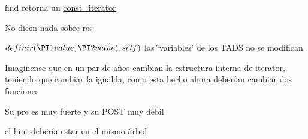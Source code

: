
\begin{DoxyRefList}
\item[\label{deprecated__deprecated000006}%
\hypertarget{deprecated__deprecated000006}{}%
Miembro \hyperlink{classaed2_1_1map_a0b0a11f906da2926f9eb342fcee79fd7_a0b0a11f906da2926f9eb342fcee79fd7}{aed2\+:\+:map$<$ Key, Meaning, Compare $>$\+:\+:at} (const Key \&key) const ]find retorna un \hyperlink{classaed2_1_1map_1_1const__iterator}{const\+\_\+iterator}  
\item[\label{deprecated__deprecated000008}%
\hypertarget{deprecated__deprecated000008}{}%
Miembro \hyperlink{classaed2_1_1map_ad8e796bf9c9c558e5ce6b61e116253fe_ad8e796bf9c9c558e5ce6b61e116253fe}{aed2\+:\+:map$<$ Key, Meaning, Compare $>$\+:\+:erase} (\hyperlink{classaed2_1_1map_1_1const__iterator}{const\+\_\+iterator} pos)]No dicen nada sobre res 
\item[\label{deprecated__deprecated000007}%
\hypertarget{deprecated__deprecated000007}{}%
Miembro \hyperlink{classaed2_1_1map_a2ef6723c183916276b0afc4a4c721475_a2ef6723c183916276b0afc4a4c721475}{aed2\+:\+:map$<$ Key, Meaning, Compare $>$\+:\+:insert\+\_\+or\+\_\+assign} (\hyperlink{classaed2_1_1map_1_1const__iterator}{const\+\_\+iterator} hint, const value\+\_\+type \&value)]$ definir(\PI1 value, \PI2 value), self) $ las \char`\"{}variables\char`\"{} de los T\+A\+DS no se modifican 
\item[\label{deprecated__deprecated000010}%
\hypertarget{deprecated__deprecated000010}{}%
Miembro \hyperlink{classaed2_1_1map_1_1iterator_a836c7a166d63f507c4f79085ae953c51_a836c7a166d63f507c4f79085ae953c51}{aed2\+:\+:map$<$ Key, Meaning, Compare $>$\+:\+:iterator\+:\+:operator!=} (iterator other) const ]Imaginense que en un par de años cambian la estructura interna de iterator, teniendo que cambiar la igualda, como esta hecho ahora deberían cambiar dos funciones 
\item[\label{deprecated__deprecated000009}%
\hypertarget{deprecated__deprecated000009}{}%
Miembro \hyperlink{classaed2_1_1map_1_1iterator_ad052c1ef8477a1613c292202226053a5_ad052c1ef8477a1613c292202226053a5}{aed2\+:\+:map$<$ Key, Meaning, Compare $>$\+:\+:iterator\+:\+:operator==} (iterator other) const ]Su pre es muy fuerte y su P\+O\+ST muy débil 
\item[\label{deprecated__deprecated000003}%
\hypertarget{deprecated__deprecated000003}{}%
Miembro \hyperlink{classaed2_1_1map_a7a77950a3d8e637bfa7cf5dcd904f257_a7a77950a3d8e637bfa7cf5dcd904f257}{aed2\+:\+:map$<$ Key, Meaning, Compare $>$\+:\+:map} (const map \&other)]el hint debería estar en el mismo árbol 

\end{DoxyRefList}
